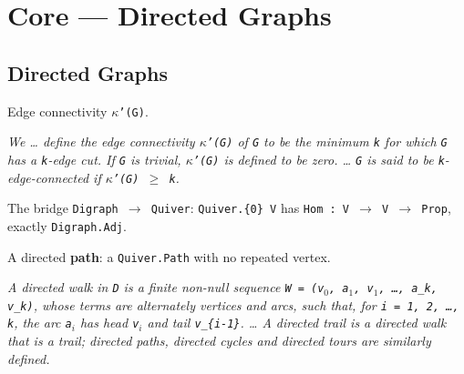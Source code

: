 \section{Core --- Directed Graphs}
\subsection{Directed Graphs}


\begin{definition}
\label{edgeConnectivity}
\leanok
{}
Edge connectivity \texttt{$\kappa$'(G)}.

\emph{We \dots{} define the edge connectivity
\texttt{$\kappa$'(G)} of \texttt{G} to be the minimum \texttt{k} for which \texttt{G} has a \texttt{k}-edge cut.  If \texttt{G} is
trivial, \texttt{$\kappa$'(G)} is defined to be zero. \dots{} \texttt{G} is said to be
\texttt{k}-edge-connected if
\texttt{$\kappa$'(G) $\ge$ k}.}
\end{definition}

\begin{definition}
\label{Digraph.toQuiver}
\leanok
The bridge \texttt{Digraph $\to$ Quiver}: \texttt{Quiver.\{0\} V} has \texttt{Hom : V
$\to$ V $\to$ Prop}, exactly \texttt{Digraph.Adj}.
\end{definition}

\begin{definition}
\label{Digraph.IsDirectedPath}
\leanok
{}
A directed \textbf{path}: a \texttt{Quiver.Path} with no repeated vertex.

\emph{A directed walk in \texttt{D} is a finite
non-null sequence \texttt{W = (v$_{0}$, a$_{1}$, v$_{1}$, \dots{}, a\_k, v\_k)}, whose
terms are alternately
vertices and arcs, such that, for \texttt{i = 1, 2, \dots{}, k}, the arc
\texttt{a$_{i}$} has head \texttt{v$_{i}$} and
tail \texttt{v\_\{i-1\}}. \dots{} A directed trail is a directed walk that is a trail;
directed
paths, directed cycles and directed tours are similarly defined.}
\end{definition}

